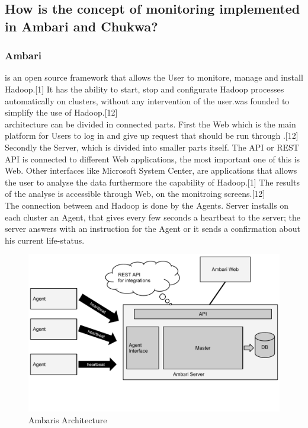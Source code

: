 \subsection{How is the concept of monitoring implemented in Ambari and Chukwa?}
\label{subsec:Implementation}

\subsubsection{Ambari}
\amb is an open source framework that allows the User to monitore, manage and install Hadoop.[1] It has the ability to start, stop and configurate Hadoop processes automatically on clusters, without any intervention of the user.\amb was founded to simplify the use of Hadoop.[12]
\\
\amb architecture can be divided in connected parts. First the \amb Web which is the main platform for Users to log in and give up request that should be run through \amb.[12] Secondly the \amb Server, which is divided into smaller parts itself. The API or REST API is connected to different Web applications, the most important one of this is \amb Web. Other interfaces like Microsoft System Center, are applications that allows the user to analyse the data furthermore the capability of Hadoop.[1] The results of the analyse is accessible through \amb Web, on the monitroing screens.[12]
\\
The connection between \amb and Hadoop is done by the \amb Agents. \amb Server installs on each cluster an \amb Agent, that gives every few seconds a heartbeat to the server; the server answers with an instruction for the Agent or it sends a confirmation about his current life-status.
\\
\begin{figure}[hbt]
  \centering
  \includegraphics[width=\linewidth,clip=true,trim=0 3cm 0 0]{images/AmbariArchitecture}
  \caption{Ambaris Architecture~\cite{Sako}}
  \label{fig:AmbariArchitecture}
\end{figure}

